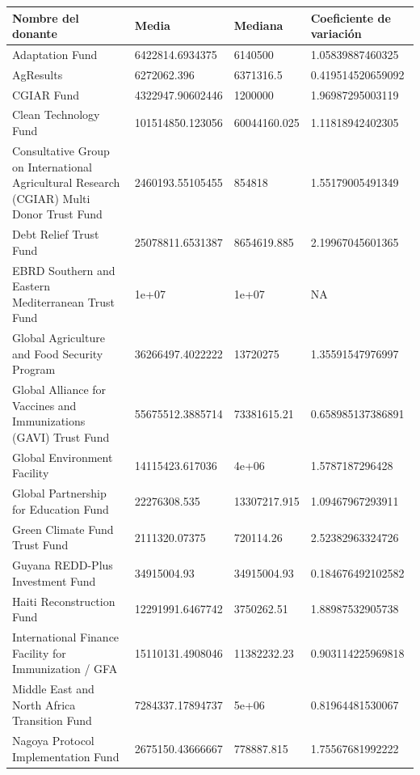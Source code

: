 \documentclass[11pt,letterpaper]{article}
\begin{document}
\begin{table}[t]
\centering
\tiny
\begin{tabular}{|p{3cm}|p{2cm}|p{2cm}|p{2cm}|} \hline
{\sc Nombre del donante} & {\sc Media} & {\sc Mediana} & {\sc Coeficiente de variación}\\ \hline
 Adaptation Fund & 6422814.6934375 & 6140500 & 1.05839887460325\\  \hline
 AgResults & 6272062.396 & 6371316.5 & 0.419514520659092\\ \hline
 CGIAR Fund & 4322947.90602446 & 1200000 & 1.96987295003119\\ \hline
 Clean Technology Fund & 101514850.123056 & 60044160.025 & 1.11818942402305\\ \hline
 Consultative Group on International Agricultural Research (CGIAR) Multi Donor Trust Fund & 2460193.55105455 & 854818 & 1.55179005491349\\ \hline
 Debt Relief Trust Fund & 25078811.6531387 & 8654619.885 & 2.19967045601365\\ \hline
 EBRD Southern and Eastern Mediterranean Trust Fund & 1e+07 & 1e+07 & NA\\ \hline
 Global Agriculture and Food Security Program & 36266497.4022222 & 13720275 & 1.35591547976997\\ \hline
 Global Alliance for Vaccines and Immunizations (GAVI) Trust Fund & 55675512.3885714 & 73381615.21 & 0.658985137386891\\ \hline
 Global Environment Facility & 14115423.617036 & 4e+06 & 1.5787187296428\\ \hline
 Global Partnership for Education Fund & 22276308.535 & 13307217.915 & 1.09467967293911\\ \hline
Green Climate Fund Trust Fund & 2111320.07375 & 720114.26 & 2.52382963324726\\ \hline
 Guyana REDD-Plus Investment Fund & 34915004.93 & 34915004.93 & 0.184676492102582\\ \hline
 Haiti Reconstruction Fund & 12291991.6467742 & 3750262.51 & 1.88987532905738\\ \hline
 International Finance Facility for Immunization / GFA & 15110131.4908046 & 11382232.23 & 0.903114225969818\\ \hline
 Middle East and North Africa Transition Fund & 7284337.17894737 & 5e+06 & 0.81964481530067\\ \hline
 Nagoya Protocol Implementation Fund & 2675150.43666667 & 778887.815 & 1.75567681992222\\ \hline

\end{tabular}
\end{table}
\end{document}
